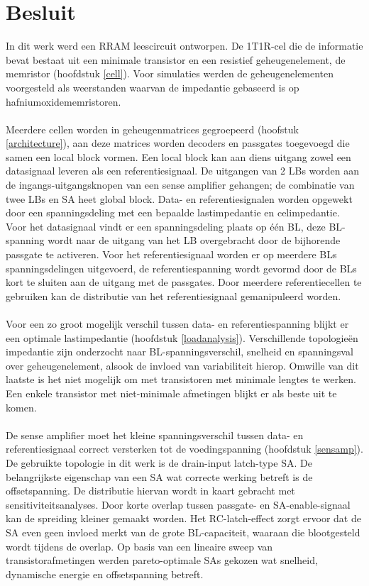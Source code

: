 \chapter{Besluit}
\label{besluit}
In dit werk werd een RRAM leescircuit ontworpen. De 1T1R-cel die de informatie bevat bestaat uit een minimale transistor en een resistief geheugenelement, de memristor (hoofdstuk \ref{cell}). Voor simulaties werden de geheugenelementen voorgesteld als weerstanden waarvan de impedantie gebaseerd is op hafniumoxidememristoren.\\\\
Meerdere cellen worden in geheugenmatrices gegroepeerd (hoofstuk \ref{architecture}), aan deze matrices worden decoders en passgates toegevoegd die samen een local block vormen. Een local block kan aan diens uitgang zowel een datasignaal leveren als een referentiesignaal. De uitgangen van 2 LBs worden aan de ingangs-uitgangsknopen van een sense amplifier gehangen; de combinatie van twee LBs en SA heet global block. Data- en referentiesignalen worden opgewekt door een spanningsdeling met een bepaalde lastimpedantie en celimpedantie. Voor het datasignaal vindt er een spanningsdeling plaats op één BL, deze BL-spanning wordt naar de uitgang van het LB overgebracht door de bijhorende passgate te activeren. Voor het referentiesignaal worden er op meerdere BLs spanningsdelingen uitgevoerd, de referentiespanning wordt gevormd door de BLs kort te sluiten aan de uitgang met de passgates. Door meerdere referentiecellen te gebruiken kan de distributie van het referentiesignaal gemanipuleerd worden.\\\\
Voor een zo groot mogelijk verschil tussen data- en referentiespanning blijkt er een optimale lastimpedantie (hoofdstuk \ref{loadanalysis}). Verschillende topologieën impedantie zijn onderzocht naar BL-spanningsverschil, snelheid en spanningsval over geheugenelement, alsook de invloed van variabiliteit hierop. Omwille van dit laatste is het niet mogelijk om met transistoren met minimale lengtes te werken. Een enkele transistor met niet-minimale afmetingen blijkt er als beste uit te komen.\\\\
De sense amplifier moet het kleine spanningsverschil tussen data- en referentiesignaal correct versterken tot de voedingspanning (hoofdstuk \ref{sensamp}). De gebruikte topologie in dit werk is de drain-input latch-type SA. De belangrijkste eigenschap van een SA wat correcte werking betreft is de offsetspanning. De distributie hiervan wordt in kaart gebracht met sensitiviteitsanalyses. Door korte overlap tussen passgate- en SA-enable-signaal kan de spreiding kleiner gemaakt worden. Het RC-latch-effect zorgt ervoor dat de SA even geen invloed merkt van de grote BL-capaciteit, waaraan die blootgesteld wordt tijdens de overlap. Op basis van een lineaire sweep van transistorafmetingen werden  pareto-optimale SAs gekozen wat snelheid, dynamische energie en offsetspanning betreft.\\\\
